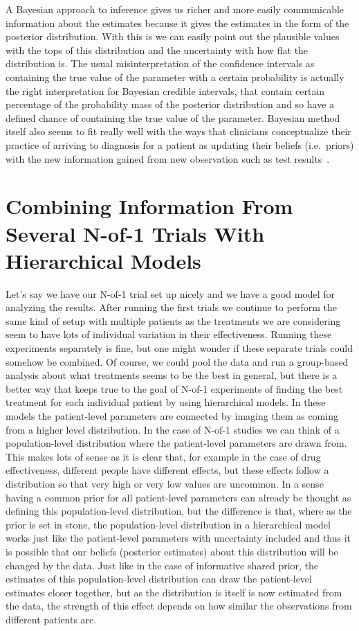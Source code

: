 \documentclass[12pt,a4paper,leqno]{report}
\theoremstyle{plain}
\theoremstyle{definition}
\theoremstyle{remark}
\begin{document}
A Bayesian approach to inference gives us richer and more easily communicable
information about the estimates because it gives the estimates in the form of the
posterior distribution. With this is we can easily point out the plausible values
with the tops of this distribution and the uncertainty with how flat the
distribution is. The usual misinterpretation of the confidence intervals as
containing the true value of the parameter with a certain probability is actually
the right interpretation for Bayesian credible intervals, that contain certain
percentage of the probability mass of the posterior distribution and so have a
defined chance of containing the true value of the parameter. Bayesian method itself
also seems to fit really well with the ways that clinicians conceptualize
their practice of arriving to  diagnosis for a patient as updating their beliefs
(i.e.\ priors) with the new information gained from new observation such as test
results\ \cite{clinbayes}.

\chapter{Combining Information From Several N-of-1 Trials With Hierarchical Models}\label{hierarchicalbayes}

Let's say we have our N-of-1 trial set up nicely and we have a good model for analyzing the
results. After running the first trials we continue to perform the same kind of setup
with multiple patients as the treatments we are considering seem to have lots of
individual variation in their effectiveness. Running these experiments separately is
fine, but one might wonder if these separate trials could somehow be combined. Of
course, we could pool the data and run a group-based
analysis about what treatments seems to be the best in general, but there is a better
way that keeps true to the goal of N-of-1 experiments of finding the best treatment for
each individual patient by using hierarchical models. In these models the
patient-level parameters are connected by imaging them as coming from a higher level
distribution. In the case of N-of-1 studies we can think of a population-level distribution
where the patient-level parameters are drawn from. This makes lots of sense as it is
clear that, for example in the case of drug effectiveness, different people have different
effects, but these effects follow a distribution so that very high or very low values are
uncommon. In a sense having a common prior for
all patient-level parameters can already be thought as defining this population-level
distribution, but the difference is that, where as the prior
is set in stone, the population-level
distribution in a hierarchical model works just like the patient-level
parameters with uncertainty included and thus it is possible that our beliefs (posterior
estimates) about this distribution will be changed by the data. Just like in the case of
informative shared prior,
the estimates of this population-level distribution can draw the
patient-level estimates closer together, but as the distribution is itself is now
estimated from the data, the strength of this effect depends on how similar the
observations from different patients are.
\end{document}

